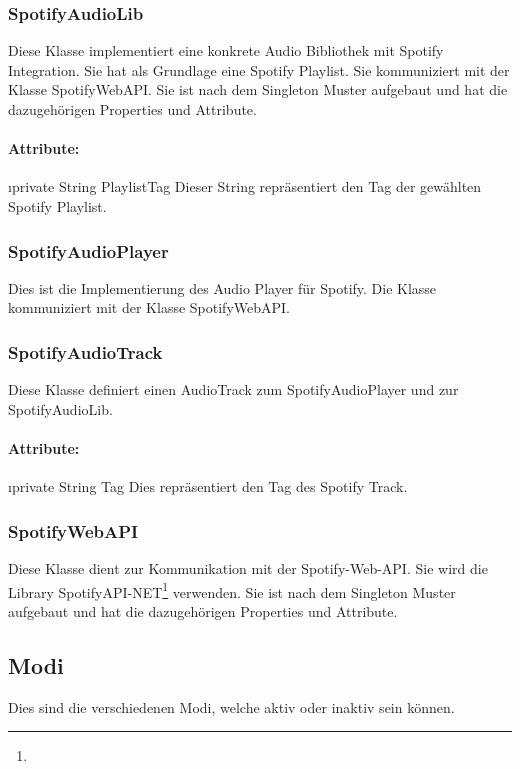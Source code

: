 \documentclass[../entwurf.tex]{subfiles}
\begin{document}
			\subsubsection{SpotifyAudioLib}
				Diese Klasse implementiert eine konkrete Audio Bibliothek mit Spotify Integration.
				Sie hat als Grundlage eine Spotify Playlist. Sie kommuniziert mit der Klasse SpotifyWebAPI.
				Sie ist nach dem Singleton Muster aufgebaut und hat die dazugehörigen Properties und Attribute.
				\paragraph{Attribute:}
					\begin{itemize}
						\i{private String PlaylistTag} Dieser String repräsentiert den Tag der gewählten Spotify Playlist.
					\end{itemize}
			\subsubsection{SpotifyAudioPlayer}
				Dies ist die Implementierung des Audio Player für Spotify. Die Klasse kommuniziert mit der Klasse SpotifyWebAPI.
			\subsubsection{SpotifyAudioTrack}
				Diese Klasse definiert einen AudioTrack zum SpotifyAudioPlayer und zur SpotifyAudioLib.
				\paragraph{Attribute:}
					\begin{itemize}
						\i{private String Tag} Dies repräsentiert den Tag des Spotify Track.
					\end{itemize}
			\subsubsection{SpotifyWebAPI}
				Diese Klasse dient zur Kommunikation mit der Spotify-Web-API. Sie wird die Library 
				SpotifyAPI-NET\footnote{} verwenden.
				Sie ist nach dem Singleton Muster aufgebaut und hat die dazugehörigen Properties und Attribute.
		\subsection{Modi}
			Dies sind die verschiedenen Modi, welche aktiv oder inaktiv sein können.
\end{document}

